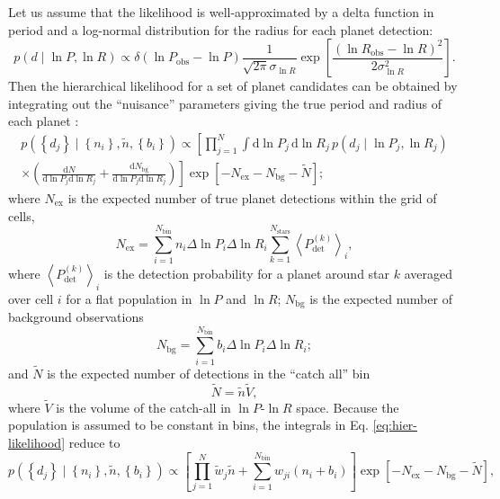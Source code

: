 \documentclass[modern]{aastex62}
\newcommand{\dd}{\mathrm{d}}
\newcommand{\diff}[2]{\frac{\dd #1}{\dd #2}}
\begin{document}
Let us assume that the likelihood is well-approximated by a delta function in
period and a log-normal distribution for the radius for each planet detection:
%
\begin{equation}
    p\left( d \mid \ln P, \ln R \right) \propto \delta\left( \ln P_\mathrm{obs} - \ln P \right) \frac{1}{\sqrt{2\pi} \sigma_{\ln R}} \exp\left[ \frac{\left( \ln R_\mathrm{obs} - \ln R \right)^2}{2 \sigma_{\ln R}^2} \right].
\end{equation}
%
Then the hierarchical likelihood for a set of planet candidates can be obtained
by integrating out the ``nuisance'' parameters giving the true period and radius
of each planet \citep{Mandel2018,Loredo2004}:
%
\begin{multline}
  \label{eq:hier-likelihood}
  p\left( \left\{ d_j \right\} \mid \left\{ n_i \right\}, \tilde{n}, \left\{b_i \right\} \right) \propto  \left[ \prod_{j = 1}^{N} \int \dd \ln P_j \, \dd \ln R_j \, p\left( d_j \mid \ln P_j, \ln R_j \right) \right. \\ \times \left. \left( \diff{N}{\ln P_j \dd \ln R_j} + \diff{N_\mathrm{bg}}{\ln P_j \dd \ln R_j} \right) \right] \exp\left[ - N_\mathrm{ex} - N_\mathrm{bg} - \tilde{N} \right];
\end{multline}
%
where $N_\mathrm{ex}$ is the expected number of true planet detections within the
grid of cells,
%
\begin{equation}
  N_\mathrm{ex} = \sum_{i=1}^{N_\mathrm{bin}} n_i \Delta \ln P_i \Delta \ln R_i \sum_{k = 1}^{N_\mathrm{stars}}  \left\langle P_\mathrm{det}^{(k)} \right\rangle_i,
\end{equation}
%
where $\left\langle P_\mathrm{det}^{(k)} \right\rangle_i$ is the detection
probability for a planet around star $k$ averaged over cell $i$ for a flat
population in $\ln P$ and $\ln R$; $N_\mathrm{bg}$ is the expected number of
background observations
%
\begin{equation}
  N_\mathrm{bg} = \sum_{i=1}^{N_\mathrm{bin}} b_i \Delta \ln P_i \Delta \ln R_i;
\end{equation}
%
and $\tilde{N}$ is the expected number of detections in the ``catch all'' bin
%
\begin{equation}
  \tilde{N} = \tilde{n} \tilde{V},
\end{equation}
%
where $\tilde{V}$ is the volume of the catch-all in $\ln P$-$\ln R$ space.
Because the population is assumed to be constant in bins, the integrals in Eq.
\eqref{eq:hier-likelihood} reduce to
%
\begin{equation}
  \label{eq:reduced-likelihood}
  p\left( \left\{ d_j \right\} \mid \left\{ n_i \right\}, \tilde{n}, \left\{b_i \right\} \right) \propto  \left[ \prod_{j = 1}^{N} \tilde{w}_j \tilde{n} + \sum_{i=1}^{N_\mathrm{bin}} w_{ji} \left( n_i + b_i \right) \right] \exp\left[ - N_\mathrm{ex} - N_\mathrm{bg} - \tilde{N} \right],
\end{equation}
\end{document}
